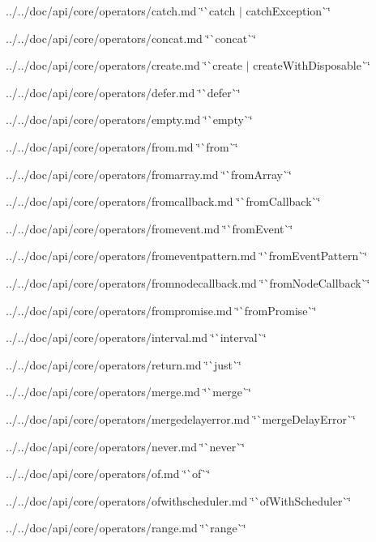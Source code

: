 \begin{DoxyItemize}
\item ../../doc/api/core/operators/catch.md \char`\"{}\`{}catch $\vert$ catch\+Exception\`{}\char`\"{}
\item ../../doc/api/core/operators/concat.md \char`\"{}\`{}concat\`{}\char`\"{}
\item ../../doc/api/core/operators/create.md \char`\"{}\`{}create $\vert$ create\+With\+Disposable\`{}\char`\"{}
\item ../../doc/api/core/operators/defer.md \char`\"{}\`{}defer\`{}\char`\"{}
\item ../../doc/api/core/operators/empty.md \char`\"{}\`{}empty\`{}\char`\"{}
\item ../../doc/api/core/operators/from.md \char`\"{}\`{}from\`{}\char`\"{}
\item ../../doc/api/core/operators/fromarray.md \char`\"{}\`{}from\+Array\`{}\char`\"{}
\item ../../doc/api/core/operators/fromcallback.md \char`\"{}\`{}from\+Callback\`{}\char`\"{}
\item ../../doc/api/core/operators/fromevent.md \char`\"{}\`{}from\+Event\`{}\char`\"{}
\item ../../doc/api/core/operators/fromeventpattern.md \char`\"{}\`{}from\+Event\+Pattern\`{}\char`\"{}
\item ../../doc/api/core/operators/fromnodecallback.md \char`\"{}\`{}from\+Node\+Callback\`{}\char`\"{}
\item ../../doc/api/core/operators/frompromise.md \char`\"{}\`{}from\+Promise\`{}\char`\"{}
\item ../../doc/api/core/operators/interval.md \char`\"{}\`{}interval\`{}\char`\"{}
\item ../../doc/api/core/operators/return.md \char`\"{}\`{}just\`{}\char`\"{}
\item ../../doc/api/core/operators/merge.md \char`\"{}\`{}merge\`{}\char`\"{}
\item ../../doc/api/core/operators/mergedelayerror.md \char`\"{}\`{}merge\+Delay\+Error\`{}\char`\"{}
\item ../../doc/api/core/operators/never.md \char`\"{}\`{}never\`{}\char`\"{}
\item ../../doc/api/core/operators/of.md \char`\"{}\`{}of\`{}\char`\"{}
\item ../../doc/api/core/operators/ofwithscheduler.md \char`\"{}\`{}of\+With\+Scheduler\`{}\char`\"{}
\item ../../doc/api/core/operators/range.md \char`\"{}\`{}range\`{}\char`\"{}

\end{DoxyItemize}
